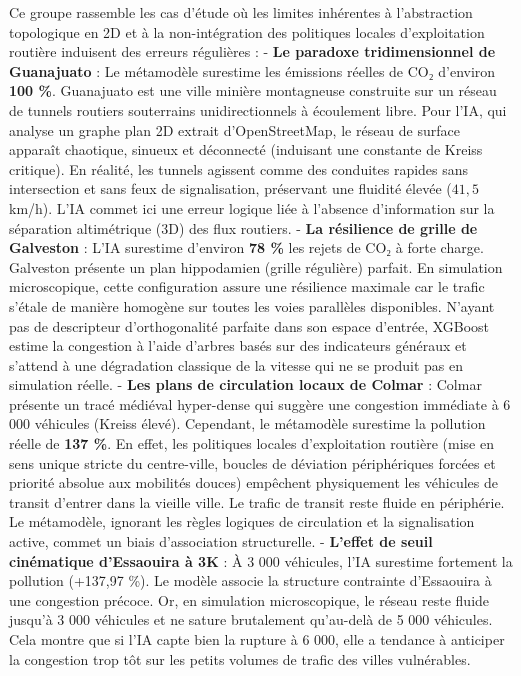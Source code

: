 \documentclass[10pt, a4paper]{article}
\begin{document}
Ce groupe rassemble les cas d'étude où les limites inhérentes à
l'abstraction topologique en 2D et à la non-intégration des politiques
locales d'exploitation routière induisent des erreurs régulières : -
\textbf{Le paradoxe tridimensionnel de Guanajuato} : Le métamodèle
surestime les émissions réelles de CO₂ d'environ \textbf{100 \%}.
Guanajuato est une ville minière montagneuse construite sur un réseau de
tunnels routiers souterrains unidirectionnels à écoulement libre. Pour
l'IA, qui analyse un graphe plan 2D extrait d'OpenStreetMap, le réseau
de surface apparaît chaotique, sinueux et déconnecté (induisant une
constante de Kreiss critique). En réalité, les tunnels agissent comme
des conduites rapides sans intersection et sans feux de signalisation,
préservant une fluidité élevée (\(41,5\) km/h). L'IA commet ici une
erreur logique liée à l'absence d'information sur la séparation
altimétrique (3D) des flux routiers. - \textbf{La résilience de grille
de Galveston} : L'IA surestime d'environ \textbf{78 \%} les rejets de
CO₂ à forte charge. Galveston présente un plan hippodamien (grille
régulière) parfait. En simulation microscopique, cette configuration
assure une résilience maximale car le trafic s'étale de manière homogène
sur toutes les voies parallèles disponibles. N'ayant pas de descripteur
d'orthogonalité parfaite dans son espace d'entrée, XGBoost estime la
congestion à l'aide d'arbres basés sur des indicateurs généraux et
s'attend à une dégradation classique de la vitesse qui ne se produit pas
en simulation réelle. - \textbf{Les plans de circulation locaux de
Colmar} : Colmar présente un tracé médiéval hyper-dense qui suggère une
congestion immédiate à 6 000 véhicules (Kreiss élevé). Cependant, le
métamodèle surestime la pollution réelle de \textbf{137 \%}. En effet,
les politiques locales d'exploitation routière (mise en sens unique
stricte du centre-ville, boucles de déviation périphériques forcées et
priorité absolue aux mobilités douces) empêchent physiquement les
véhicules de transit d'entrer dans la vieille ville. Le trafic de
transit reste fluide en périphérie. Le métamodèle, ignorant les règles
logiques de circulation et la signalisation active, commet un biais
d'association structurelle. - \textbf{L'effet de seuil cinématique
d'Essaouira à 3K} : À 3 000 véhicules, l'IA surestime fortement la
pollution (+137,97 \%). Le modèle associe la structure contrainte
d'Essaouira à une congestion précoce. Or, en simulation microscopique,
le réseau reste fluide jusqu'à 3 000 véhicules et ne sature brutalement
qu'au-delà de 5 000 véhicules. Cela montre que si l'IA capte bien la
rupture à 6 000, elle a tendance à anticiper la congestion trop tôt sur
les petits volumes de trafic des villes vulnérables.
\end{document}
